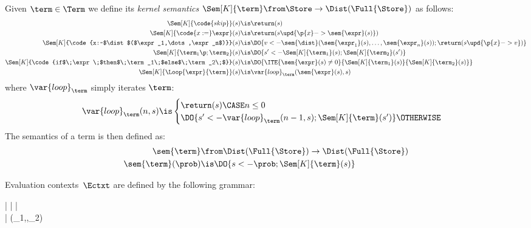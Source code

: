 \documentclass[acmsmall,nonacm,screen,appendix]{acmart}
\begin{document}
\begin{definition}
\label{def:semantics}
  Given $\term \in \Term$ we define its \emph{kernel semantics}
  $\Sem[K]{\term} \from \Store \to \Dist(\Full{\Store}) $
  as follows:
  \begin{align*}
    \Sem[K]{\code{skip}}(s) &\is
      \return(s)
    \\
    \Sem[K]{\code{x:=}\expr}(s) &\is
        \return(s\upd{\p{x}->\sem{\expr}(s)})
    \\
    \Sem[K]{\code{x:~$\dist$($\expr_1,\dots,\expr_n$)}}(s) &\is
      \DO{
        v <- \sem{\dist}(\sem{\expr_1}(s),\dots,\sem{\expr_n}(s));
        \return(s\upd{\p{x}->v})
      }
    \\
    \Sem[K]{\term_1\p;\term_2}(s) &\is
      \DO{
        s' <- \Sem[K]{\term_1}(s);
        \Sem[K]{\term_2}(s')
      }
    \\
    \Sem[K]{\code{if$\;\expr\;$then$\;\term_1\;$else$\;\term_2\;$}}(s) &\is
      \DO{
        \ITE{\sem{\expr}(s) \ne 0}
          {\Sem[K]{\term_1}(s)}
          {\Sem[K]{\term_2}(s)}
      }
    \\
    \Sem[K]{\Loop{\expr}{\term}}(s) &\is
      \var{loop}_{\term}(\sem{\expr}(s), s)
\end{align*}
  where $\var{loop}_{\term}$ simply iterates $\term$:
  \[
    \var{loop}_{\term}(n, s) \is
      \begin{cases}
        \return(s) \CASE n \leq 0 \\
        \DO{s' <- \var{loop}_{\term}(n-1, s); \Sem[K]{\term}(s')} \OTHERWISE
      \end{cases}
  \]
The semantics of a term is then defined as:
  \begin{align*}
    \sem{\term} &\from \Dist(\Full{\Store}) \to \Dist(\Full{\Store})
    \\
    \sem{\term}(\prob) &\is \DO{s <- \prob; \Sem[K]{\term}(s)}
  \end{align*}
\end{definition}

Evaluation contexts~$\Ectxt$ are defined by the following grammar:
\begin{grammar}
  \Ectxt \is
    | 
| 
    | \Loop{\pr{\Ectxt}}{\term}
  \\
  \pr{\Ectxt} \is
      [\hole]
    | \prim(\vec{\expr}_1,\pr{\Ectxt},\vec{\expr}_2)
\end{grammar}
\end{document}
